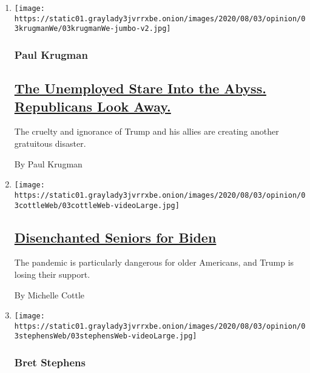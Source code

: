 \begin{enumerate}
\def\labelenumi{\arabic{enumi}.}
\item
  \texttt{[image: https://static01.graylady3jvrrxbe.onion/images/2020/08/03/opinion/03krugmanWe/03krugmanWe-jumbo-v2.jpg]}

  \hypertarget{paul-krugman}{%
  \subsubsection{Paul Krugman}\label{paul-krugman}}

  \hypertarget{the-unemployed-stare-into-the-abyss-republicans-look-away}{%
  \subsection{\texorpdfstring{\href{/2020/08/03/opinion/republicans-unemployed-coronavirus.html}{The
  Unemployed Stare Into the Abyss. Republicans Look
  Away.}}{The Unemployed Stare Into the Abyss. Republicans Look Away.}}\label{the-unemployed-stare-into-the-abyss-republicans-look-away}}

  The cruelty and ignorance of Trump and his allies are creating another
  gratuitous disaster.

  By Paul Krugman
\item
  \texttt{[image: https://static01.graylady3jvrrxbe.onion/images/2020/08/03/opinion/03cottleWeb/03cottleWeb-videoLarge.jpg]}

  \hypertarget{disenchanted-seniors-for-biden}{%
  \subsection{\texorpdfstring{\href{/2020/08/03/opinion/senior-voters-biden-trump-2020.html}{Disenchanted
  Seniors for
  Biden}}{Disenchanted Seniors for Biden}}\label{disenchanted-seniors-for-biden}}

  The pandemic is particularly dangerous for older Americans, and Trump
  is losing their support.

  By Michelle Cottle
\item
  \texttt{[image: https://static01.graylady3jvrrxbe.onion/images/2020/08/03/opinion/03stephensWeb/03stephensWeb-videoLarge.jpg]}

  \hypertarget{bret-stephens}{%
  \subsubsection{Bret Stephens}\label{bret-stephens}}


\end{enumerate}
